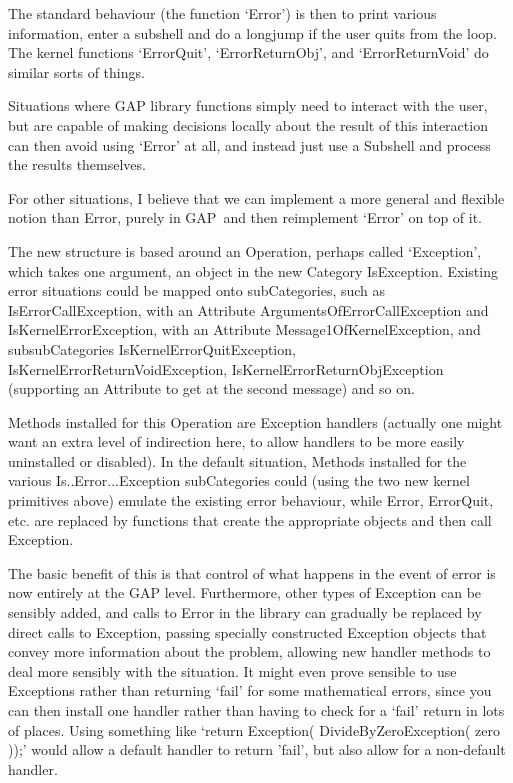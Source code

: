 \documentclass{article}
\def\GAP{\textsf{GAP}}
\begin{document}
The standard behaviour (the function `Error') is then to
print various information, enter a subshell and do a longjump if the
user quits from the loop. The kernel functions `ErrorQuit',
`ErrorReturnObj', and `ErrorReturnVoid' do similar sorts of things.

Situations where GAP library functions simply need to interact with
the user, but are capable of making decisions locally about the result 
of this interaction can then avoid using `Error' at all, and instead
just use a Subshell and process the results themselves.

For other situations, I believe that we can implement a more general
and flexible notion than Error, purely in \GAP\ and then reimplement
`Error' on top of it.

The new structure is based around an Operation, perhaps called
`Exception', which takes one argument, an object in the new Category
IsException.  Existing error situations could be mapped onto
subCategories, such as IsErrorCallException, with an Attribute
ArgumentsOfErrorCallException and IsKernelErrorException, with an
Attribute Message1OfKernelException, and subsubCategories
IsKernelErrorQuitException, IsKernelErrorReturnVoidException,
IsKernelErrorReturnObjException (supporting an Attribute to get at the 
second message) and so on. 

Methods installed for this Operation are Exception handlers (actually
one might want an extra level of indirection here, to allow handlers
to be more easily uninstalled or disabled). In the
default situation, Methods installed for the various
Is..Error...Exception  subCategories could (using the two new kernel
primitives above) emulate the existing error behaviour, while Error,
ErrorQuit, etc. are replaced by functions that create the appropriate
objects and then call Exception.

The basic benefit of this is that control of what happens in the event 
of error is now entirely at the GAP level. Furthermore, other types of 
Exception can be sensibly added, and calls to Error in the library can 
gradually be replaced by direct calls to Exception, passing specially
constructed Exception objects that convey more information about the
problem, allowing new handler methods to deal more sensibly with the
situation. It might even prove sensible to use Exceptions
rather than returning `fail' for some mathematical errors, since you
can then install one handler rather than having to check for a 	`fail' 
return in lots of places. Using something like `return Exception(
DivideByZeroException( zero ));' would allow a default handler to
return 'fail', but also allow for a non-default handler.
\end{document}
